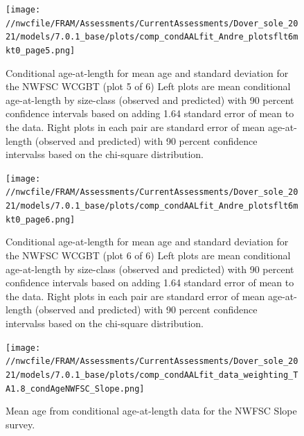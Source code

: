 \documentclass[11pt,
  english,
  a4paper,
]{article}
\begin{document}
\begin{figure}
\centering
\texttt{[image: //nwcfile/FRAM/Assessments/CurrentAssessments/Dover\_sole\_2021/models/7.0.1\_base/plots/comp\_condAALfit\_Andre\_plotsflt6mkt0\_page5.png]}
\caption{Conditional age-at-length for mean age and standard deviation for the NWFSC WCGBT (plot 5 of 6) Left plots are mean conditional age-at-length by size-class (observed and predicted) with 90 percent confidence intervals based on adding 1.64 standard error of mean to the data. Right plots in each pair are standard error of mean age-at-length (observed and predicted) with 90 percent confidence intervalss based on the chi-square distribution.\label{fig:wcgbt-caal-fit-5}}
\end{figure}

\tagmcend\tagstructend


\begin{figure}
\centering
\texttt{[image: //nwcfile/FRAM/Assessments/CurrentAssessments/Dover\_sole\_2021/models/7.0.1\_base/plots/comp\_condAALfit\_Andre\_plotsflt6mkt0\_page6.png]}
\caption{Conditional age-at-length for mean age and standard deviation for the NWFSC WCGBT (plot 6 of 6) Left plots are mean conditional age-at-length by size-class (observed and predicted) with 90 percent confidence intervals based on adding 1.64 standard error of mean to the data. Right plots in each pair are standard error of mean age-at-length (observed and predicted) with 90 percent confidence intervalss based on the chi-square distribution.\label{fig:wcgbt-caal-fit-6}}
\end{figure}

\tagmcend\tagstructend


\begin{figure}
\centering
\texttt{[image: //nwcfile/FRAM/Assessments/CurrentAssessments/Dover\_sole\_2021/models/7.0.1\_base/plots/comp\_condAALfit\_data\_weighting\_TA1.8\_condAgeNWFSC\_Slope.png]}
\caption{Mean age from conditional age-at-length data for the NWFSC Slope survey.\label{fig:nwslope-mean-caal}}
\end{figure}
\end{document}
